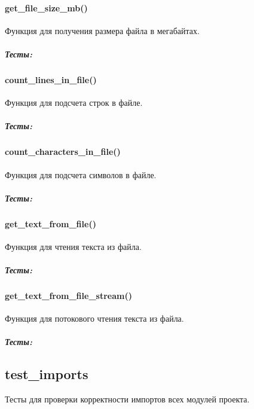 \documentclass[a4paper,11pt,russian,openany,oneside]{sphinxmanual}
\begin{document}
\paragraph{get\_file\_size\_mb()}
\label{\detokenize{tests_module:get-file-size-mb}}
\sphinxAtStartPar
Функция для получения размера файла в мегабайтах.


\subparagraph{Тесты:}
\label{\detokenize{tests_module:id37}}

\paragraph{count\_lines\_in\_file()}
\label{\detokenize{tests_module:count-lines-in-file}}
\sphinxAtStartPar
Функция для подсчета строк в файле.


\subparagraph{Тесты:}
\label{\detokenize{tests_module:id38}}

\paragraph{count\_characters\_in\_file()}
\label{\detokenize{tests_module:count-characters-in-file}}
\sphinxAtStartPar
Функция для подсчета символов в файле.


\subparagraph{Тесты:}
\label{\detokenize{tests_module:id39}}

\paragraph{get\_text\_from\_file()}
\label{\detokenize{tests_module:get-text-from-file}}
\sphinxAtStartPar
Функция для чтения текста из файла.


\subparagraph{Тесты:}
\label{\detokenize{tests_module:id40}}

\paragraph{get\_text\_from\_file\_stream()}
\label{\detokenize{tests_module:get-text-from-file-stream}}
\sphinxAtStartPar
Функция для потокового чтения текста из файла.


\subparagraph{Тесты:}
\label{\detokenize{tests_module:id41}}

\subsection{test\_imports}
\label{\detokenize{tests_module:test-imports}}
\sphinxAtStartPar
Тесты для проверки корректности импортов всех модулей проекта.
\end{document}
